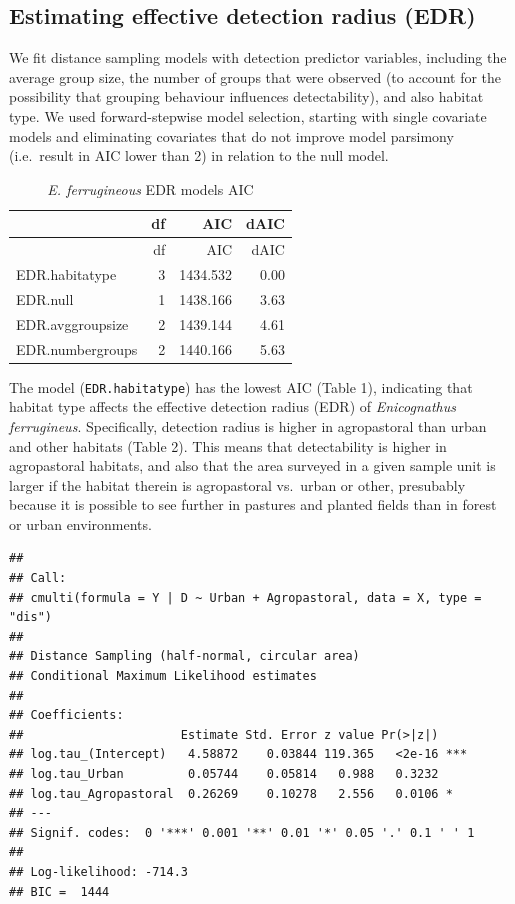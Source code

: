 \documentclass[]{article}
\begin{document}
\subsection{Estimating effective detection radius
(EDR)}\label{estimating-effective-detection-radius-edr}

We fit distance sampling models with detection predictor variables,
including the average group size, the number of groups that were
observed (to account for the possibility that grouping behaviour
influences detectability), and also habitat type. We used
forward-stepwise model selection, starting with single covariate models
and eliminating covariates that do not improve model parsimony
(i.e.~result in AIC lower than 2) in relation to the null model.

\begin{longtable}[]{@{}lrrr@{}}
\caption{\textit{E. ferrugineous} EDR models AIC}\tabularnewline
\toprule
& df & AIC & dAIC\tabularnewline
\midrule
\endfirsthead
\toprule
& df & AIC & dAIC\tabularnewline
\midrule
\endhead
EDR.habitatype & 3 & 1434.532 & 0.00\tabularnewline
EDR.null & 1 & 1438.166 & 3.63\tabularnewline
EDR.avggroupsize & 2 & 1439.144 & 4.61\tabularnewline
EDR.numbergroups & 2 & 1440.166 & 5.63\tabularnewline
\bottomrule
\end{longtable}

The model (\texttt{EDR.habitatype}) has the lowest AIC (Table 1),
indicating that habitat type affects the effective detection radius
(EDR) of \emph{Enicognathus ferrugineus}. Specifically, detection radius
is higher in agropastoral than urban and other habitats (Table 2). This
means that detectability is higher in agropastoral habitats, and also
that the area surveyed in a given sample unit is larger if the habitat
therein is agropastoral vs.~urban or other, presubably because it is
possible to see further in pastures and planted fields than in forest or
urban environments.

\begin{verbatim}
## 
## Call:
## cmulti(formula = Y | D ~ Urban + Agropastoral, data = X, type = "dis")
## 
## Distance Sampling (half-normal, circular area)
## Conditional Maximum Likelihood estimates
## 
## Coefficients:
##                      Estimate Std. Error z value Pr(>|z|)    
## log.tau_(Intercept)   4.58872    0.03844 119.365   <2e-16 ***
## log.tau_Urban         0.05744    0.05814   0.988   0.3232    
## log.tau_Agropastoral  0.26269    0.10278   2.556   0.0106 *  
## ---
## Signif. codes:  0 '***' 0.001 '**' 0.01 '*' 0.05 '.' 0.1 ' ' 1 
## 
## Log-likelihood: -714.3 
## BIC =  1444
\end{verbatim}
\end{document}
